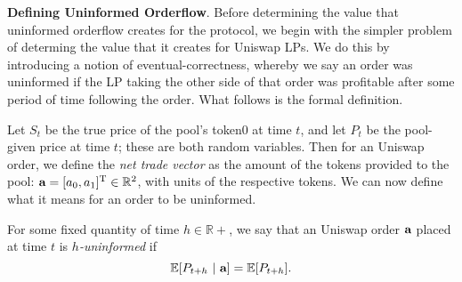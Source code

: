 

    
    \textbf{Defining Uninformed Orderflow}.
    Before determining the value that uninformed orderflow creates for the protocol, we begin with the simpler problem of determing the value that it creates for Uniswap LPs. %
    We do this by introducing a notion of eventual-correctness, whereby we say an order was uninformed if the LP taking the other side of that order was profitable after some period of time following the order. What follows is the formal definition.

    \begin{definition}[$h$-uninformedness]
        Let $S_t$ be the true price of the pool's token0 at time $t$, and let $P_t$ be the pool-given price at time $t$; these are both random variables. Then for an Uniswap order, we define the \textit{net trade vector} as the amount of the tokens provided to the pool: $\textbf a  = [a_0, a_1]^\text T \in \mathbb R^2$, with units of the respective tokens. We can now define what it means for an order to be uninformed.

        For some fixed quantity of time $h \in \mathbb R+$, we say that an Uniswap order $\textbf a$ placed at time $t$ is \textit{$h$-uninformed} if
            $$\mathbb E[P_{t+h} \ | \ \textbf a] = \mathbb E[P_{t+h}].$$  
    \end{definition}

